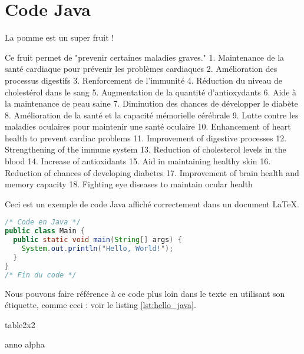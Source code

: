 \documentclass{article}
\begin{document}
\section{Code Java}

La pomme est un super fruit !

Ce fruit permet de "prevenir certaines maladies graves."
1. Maintenance de la santé cardiaque pour prévenir les problèmes cardiaques
2. Amélioration des processus digestifs
3. Renforcement de l'immunité
4. Réduction du niveau de cholestérol dans le sang
5. Augmentation de la quantité d'antioxydants
6. Aide à la maintenance de peau saine
7. Diminution des chances de développer le diabète
8. Amélioration de la santé et la capacité mémorielle cérébrale
9. Lutte contre les maladies oculaires pour maintenir une santé oculaire
10. Enhancement of heart health to prevent cardiac problems
11. Improvement of digestive processes
12. Strengthening of the immune system
13. Reduction of cholesterol levels in the blood
14. Increase of antioxidants
15. Aid in maintaining healthy skin
16. Reduction of chances of developing diabetes
17. Improvement of brain health and memory capacity
18. Fighting eye diseases to maintain ocular health

Ceci est un exemple de code Java affiché correctement dans un document LaTeX.

\begin{lstlisting}[language=Java, caption={Exemple "Hello, World!" en Java.}, label={lst:hello_java}]
/* Code en Java */
public class Main {
  public static void main(String[] args) {
    System.out.println("Hello, World!");
  }
}
/* Fin du code */
\end{lstlisting}

Nous pouvons faire référence à ce code plus loin dans le texte en utilisant son étiquette, comme ceci : voir le listing \ref{lst:hello_java}.


table2x2	

anno	
alpha 		
\end{document}
